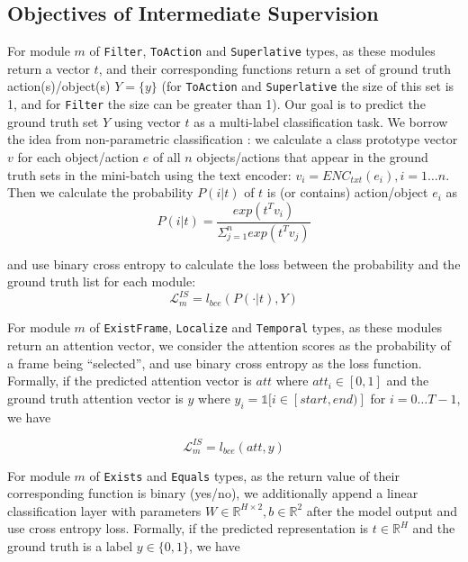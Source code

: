 \documentclass[letterpaper]{article} %
\begin{document}
\subsection{Objectives of Intermediate Supervision}
For module $m$ of \texttt{Filter}, \texttt{ToAction} and \texttt{Superlative} types, as these modules return a vector $t$, and their corresponding functions return a set of ground truth action(s)/object(s) $Y=\{y\}$ (for \texttt{ToAction} and \texttt{Superlative} the size of this set is 1, and for \texttt{Filter} the size can be greater than 1). Our goal is to predict the ground truth set $Y$ using vector $t$ as a multi-label classification task. We borrow the idea from non-parametric classification \cite{Wu2018UnsupervisedFL}: we calculate a class prototype vector $v$ for each object/action $e$ of all $n$ objects/actions that appear in the ground truth sets in the mini-batch using the text encoder: $v_i={ENC}_{txt}(e_i), i=1 \dots n$. Then we calculate the probability $P(i|t)$ of $t$ is (or contains) action/object $e_i$ as 
\begin{equation}
P(i|t)=\frac{exp(t^Tv_i)}{\Sigma_{j=1}^nexp(t^Tv_j)}
\end{equation}

and use binary cross entropy to calculate the loss between the probability and the ground truth list for each module:
\begin{equation}
\mathcal{L}^{IS}_m = l_{bce}(P(\cdot|t),Y)
\end{equation}

For module $m$ of \texttt{ExistFrame}, \texttt{Localize} and \texttt{Temporal} types, as these modules return an attention vector, we consider the attention scores as the probability of a frame being ``selected'', and use binary cross entropy as the loss function. Formally, if the predicted attention vector is $att$ where $att_i \in [0,1]$ and the ground truth attention vector is $y$ where $y_i = \mathds{1}[ i \in [start, end) ]$ for $i = 0 \dots T-1$, we have

\begin{equation}
\mathcal{L}^{IS}_m = l_{bce}(att, y)
\end{equation}

For module $m$ of \texttt{Exists} and \texttt{Equals} types, as the return value of their corresponding function is binary  (yes/no), we additionally append a linear classification layer with parameters $W \in \mathbb{R}^{H \times 2}, b \in \mathbb{R}^2$ after the model output and use cross entropy loss. Formally, if the predicted representation is $t \in \mathbb{R}^H$ and the ground truth is a label $y \in \{0, 1\}$, we have
\end{document}
